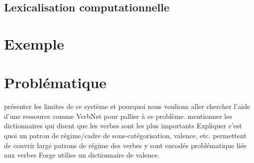 \subsection{Lexicalisation computationnelle}


\section{Exemple}


\section{Problématique}
présenter les limites de ce système et pourquoi nous voulions aller chercher l'aide d'une ressource comme VerbNet pour pallier à ce problème.
mentionner les dictionnaires qui disent que les verbes sont les plus importants
Expliquer c'est quoi un patron de régime/cadre de sous-catégorisation, valence, etc.
permettent de couvrir large
patrons de régime des verbes y sont encodés
problématique liée aux verbes
Forge utilise un dictionnaire de valence.